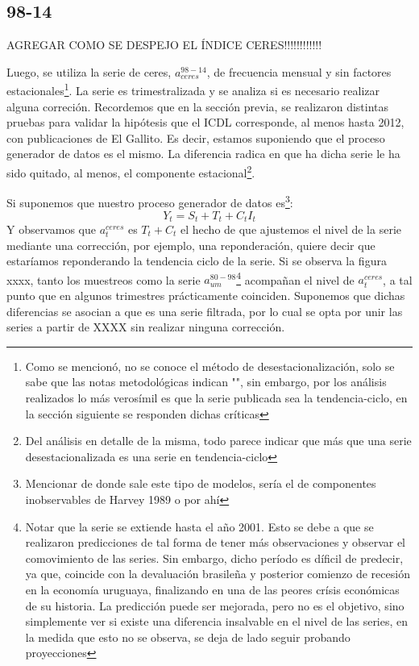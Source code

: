 \documentclass[12pt,twoside]{reedthesis}
\begin{document}
\hypertarget{section-2}{%
\subsection{98-14}\label{section-2}}

AGREGAR COMO SE DESPEJO EL ÍNDICE CERES!!!!!!!!!!!!

Luego, se utiliza la serie de ceres, \(a_{ceres}^{98-14}\), de frecuencia mensual y sin factores estacionales\footnote{Como se mencionó, no se conoce el método de desestacionalización, solo se sabe que las notas metodológicas indican "", sin embargo, por los análisis realizados lo más verosímil es que la serie publicada sea la tendencia-ciclo, en la sección siguiente se responden dichas críticas}.
La serie es trimestralizada y se analiza si es necesario realizar alguna correción. Recordemos que en la sección previa, se realizaron distintas pruebas para validar la hipótesis que el ICDL corresponde, al menos hasta 2012, con publicaciones de El Gallito. Es decir, estamos suponiendo que el proceso generador de datos es el mismo. La diferencia radica en que ha dicha serie le ha sido quitado, al menos, el componente estacional\footnote{Del análisis en detalle de la misma, todo parece indicar que más que una serie desestacionalizada es una serie en tendencia-ciclo}.

Si suponemos que nuestro proceso generador de datos es\footnote{Mencionar de donde sale este tipo de modelos, sería el de componentes inobservables de Harvey 1989 o por ahí}:
\begin{equation}
Y_t = S_t + T_t + C_t  I_t
\end{equation}
Y observamos que \(a_t^{ceres}\) es \(T_t + C_t\) el hecho de que ajustemos el nivel de la serie mediante una corrección, por ejemplo, una reponderación, quiere decir que estaríamos reponderando la tendencia ciclo de la serie. Si se observa la figura xxxx, tanto los muestreos como la serie \(a_{um}^{80-98}\)\footnote{Notar que la serie se extiende hasta el año 2001. Esto se debe a que se realizaron predicciones de tal forma de tener más observaciones y observar el comovimiento de las series. Sin embargo, dicho período es díficil de predecir, ya que, coincide con la devaluación brasileña y posterior comienzo de recesión en la economía uruguaya, finalizando en una de las peores crísis económicas de su historia. La predicción puede ser mejorada, pero no es el objetivo, sino simplemente ver si existe una diferencia insalvable en el nivel de las series, en la medida que esto no se observa, se deja de lado seguir probando proyecciones} acompañan el nivel de \(a_t^{ceres}\), a tal punto que en algunos trimestres prácticamente coinciden. Suponemos que dichas diferencias se asocian a que es una serie filtrada, por lo cual se opta por unir las series a partir de XXXX sin realizar ninguna corrección.
\end{document}
